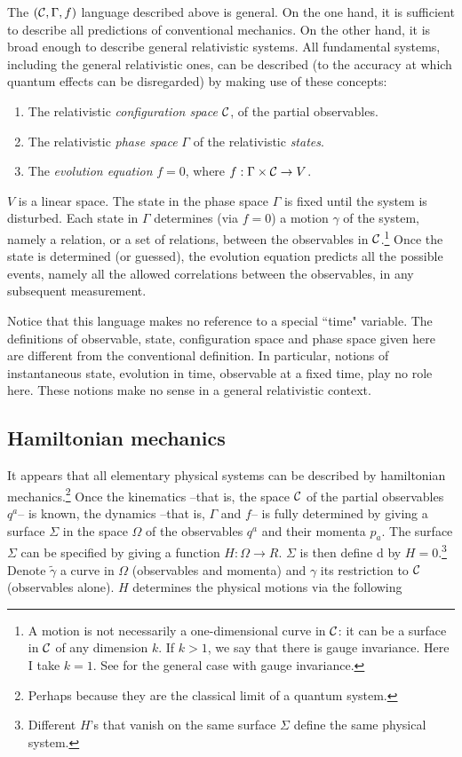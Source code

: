 \documentclass[10pt,nofootinbib]{revtex4}
\begin{document}
The $({\cal C}, \Gamma, f)$ language described above is general.  On
the one hand, it is sufficient to describe all predictions of
conventional mechanics.  On the other hand, it is broad enough to
describe general relativistic systems.    All fundamental systems, including
the general relativistic ones, can be
described (to the accuracy at which quantum effects can be
disregarded) by making use of these concepts:
\begin{enumerate}
     \item[(i)] The relativistic \emph{configuration space} $\cal C$,
     of the partial observables.  
     \item[(ii)] The relativistic \emph{phase
     space} $\Gamma$ of the
     relativistic \emph{states}.  \item[(iii)] The \emph{evolution
     equation} $f=0$, where $ f: {\Gamma}\times{\cal C} \to V$.
 \end{enumerate}
$V$ is a linear space.  The state in the phase space $\Gamma$ is fixed until the
system is disturbed.  Each state in $\Gamma$ determines (via $f=0$) a motion
$\gamma$ of the system, namely a relation, or a set of relations, between the
observables in $\cal C$.\footnote{A motion is not necessarily a one-dimensional 
curve in $\cal C$: it can be a surface in $\cal C$ of any dimension $k$.  
If $k>1$, we say that there is gauge invariance. Here I take $k=1$.  See \cite{book} for 
the general case with gauge invariance.}
Once the state is determined (or guessed), the
evolution equation predicts all the possible events, namely all the allowed
correlations between the observables, in any subsequent measurement.

Notice that this language makes no reference to a special ``time" variable.
The definitions of observable, state, configuration space and phase space given
here are different from the conventional definition.  In particular, notions of
instantaneous state, evolution in time, observable at a fixed time, play no role
here.  These notions make no sense in a general relativistic context.  

\subsection{Hamiltonian mechanics}

It appears that all elementary physical systems can be described by hamiltonian
mechanics.\footnote{Perhaps because they are the classical limit of a
quantum system.} Once the kinematics --that is, the space $\cal C$ of
the partial observables $q^a$-- is known, the dynamics --that is,
$\Gamma$ and $f$-- is fully determined by giving a surface $\Sigma$ in
the space $\Omega$ of the observables $q^a$ and their momenta $p_{a}$. 
The surface $\Sigma$ can be specified by giving a function $H: \Omega
\to R$.   $\Sigma$ is then define
 d
by $H=0$.\footnote{Different $H$'s that vanish on the same surface
$\Sigma$ define the same physical system.} Denote $\tilde\gamma$ a
curve in $\Omega$ (observables and momenta) and $\gamma$ its
restriction to $\cal C$ (observables alone).  $H$ determines the
physical motions via the following
\end{document}
